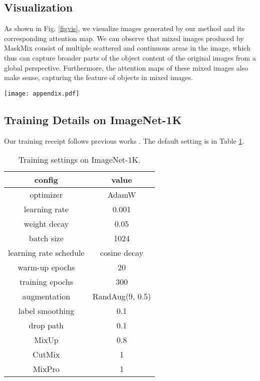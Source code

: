 \documentclass{article} \usepackage{iclr2023_conference,times}
\begin{document}
\subsection{Visualization}
As shown in Fig. \ref{figvis}, we visualize images generated by our method and its corresponding attention map. We can observe that mixed images produced by MaskMix consist of multiple scattered and continuous areas in the image, which thus can capture broader parts of the object content of the original images from a global perspective. Furthermore, the attention maps of these mixed images also make sense, capturing the feature of objects in mixed images.
    
\begin{figure*}[t]
\centering
\texttt{[image: appendix.pdf]}
\caption{Visualization. Top: Original images. Medium: Mixed images generated by our MaskMix. Bottom: Attention maps of mixed images.}
\label{figvis}
\end{figure*}


\subsection{Training Details on ImageNet-1K}
Our training receipt follows previous works \citep{deit, chen2021transmix}. The default setting is in Table \ref{tabImg}.

\begin{table}[!htb]
\caption{Training settings on ImageNet-1K.}

\label{tabImg}
	\centering
	\begin{tabular}{c|c}
    \toprule
     config   & value \\
    \midrule

    optimizer   & AdamW  \\
    
    learning rate    &  0.001 \\
    
    weight decay     & 0.05     \\
    
    batch size  & 1024  \\
    learning rate schedule  & cosine decay  \\
    warm-up epochs  & 20  \\
    training epochs  & 300  \\
    augmentation  & RandAug(9, 0.5)  \\
    label smoothing & 0.1\\
    drop path & 0.1\\
    MixUp & 0.8\\
    CutMix & 1\\
    MixPro & 1\\
    \bottomrule
\end{tabular}
\end{table}
\end{document}
